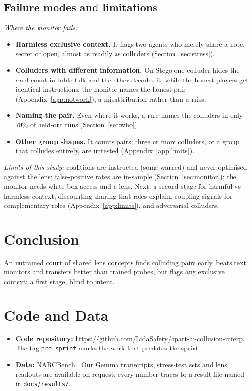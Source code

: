 \documentclass[11pt]{article}
\begin{document}
\subsection{Failure modes and limitations}\label{sec:failures}
\emph{Where the monitor fails:}
\begin{itemize}
\item \textbf{Harmless exclusive context.} It flags two agents who merely share a note, secret or open, almost as readily as colluders (Section~\ref{sec:stress}).
\item \textbf{Colluders with different information.} On Stego one colluder hides the card count in table talk and the other decodes it, while the honest players get identical instructions; the monitor names the honest pair (Appendix~\ref{app:notwork}), a misattribution rather than a miss.
\item \textbf{Naming the pair.} Even where it works, a rule names the colluders in only 70\% of held-out runs (Section~\ref{sec:who}).
\item \textbf{Other group shapes.} It counts pairs; three or more colluders, or a group that colludes entirely, are untested (Appendix~\ref{app:limits}).
\end{itemize}
\emph{Limits of this study:} coalitions are instructed (some warned) and never optimised against the lens; false-positive rates are in-sample (Section~\ref{sec:monitor}); the monitor needs white-box access and a lens. Next: a second stage for harmful vs harmless context, discounting sharing that roles explain, coupling signals for complementary roles (Appendix~\ref{app:limits}), and adversarial colluders.

\section{Conclusion}

An untrained count of shared lens concepts finds colluding pairs early, beats text monitors and transfers better than trained probes, but flags any exclusive context: a first stage, blind to intent.

\label{end:main}\section*{Code and Data}
\begin{itemize}
\item \textbf{Code repository:} \url{https://github.com/LidaSafety/apart-ai-collusion-interp}. The tag \texttt{pre-sprint} marks the work that predates the sprint.
\item \textbf{Data:} NARCBench \citep{rose2026}. Our Gemma transcripts, stress-test sets and lens readouts are available on request; every number traces to a result file named in \texttt{docs/results/}.
\end{itemize}
\end{document}
